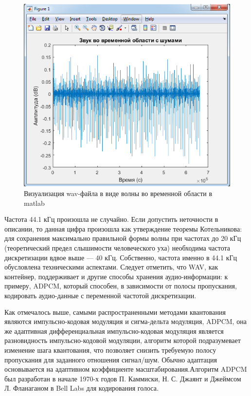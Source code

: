 \documentclass[12pt,a4paper,oneside]{report}
\begin{document}
\begin{figure}[!htbp]
	\centering
	\includegraphics[scale=0.7]{wavgraph.png}
	\caption{Визуализация wav-файла в виде волны во временной области в matlab}
	\label{ris:wavgraph}
\end{figure}

Частота 44.1 кГц произошла не случайно. Если допустить неточности в описании, то данная цифра произошла как утверждение теоремы Котельникова: для сохранения максимально правильной формы волны при частотах до 20 кГц (теоретический предел слышимости человеческого уха) необходима частота дискретизации вдвое выше — 40 кГц. Собственно, частота именно в 44.1 кГц обусловлена техническими аспектами. Следует отметить, что WAV, как контейнер, поддерживает и другие способы хранения аудио-информации: к примеру, ADPCM, который способен, в зависимости от полосы пропускания, кодировать аудио-данные с переменной частотой дискретизации.

Как отмечалось выше, самыми распространенными методами квантования являются импульсно-кодовая модуляция и сигма-дельта модуляция, ADPCM, она же адаптивная дифференциальная импульсно-кодовая модуляция является разновидность импульсно-кодовой модуляции, алгоритм которой подразумевает изменение шага квантования, что позволяет снизить требуемую полосу пропускания для заданного отношения сигнал/шум. Обычно адаптация основывается на адаптивном коэффициенте масштабирования.Алгоритм ADPCM был разработан в начале 1970-х годов П. Каммиски, Н. С. Джаянт и Джеймсом Л. Фланаганом в Bell Labs для кодирования голоса.
\end{document}
